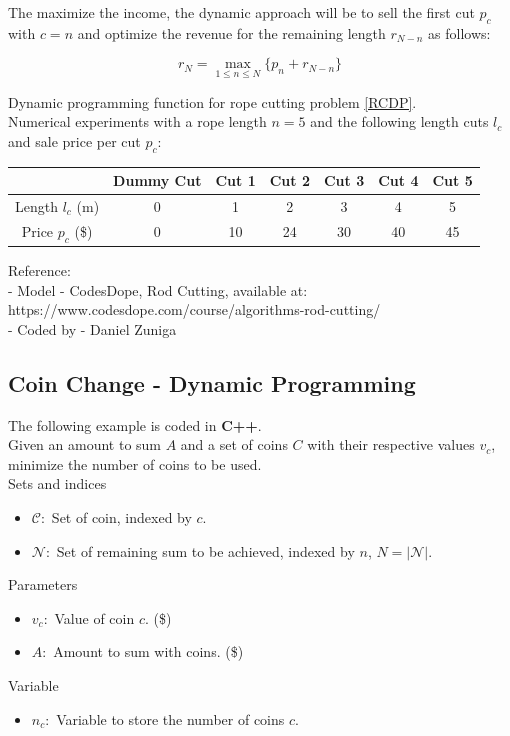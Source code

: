 \documentclass[10pt,bezier]{article}
\begin{document}
The maximize the income, the dynamic approach will be to sell the first cut $p_c$ with $c = n$ and optimize the revenue for the remaining length $r_{N-n}$ as follows:

\begin{equation}\label{RCDP}
    r_N = \max_{1 \leq n \leq N} \{p_n + r_{N-n}\}
\end{equation}

Dynamic programming function for rope cutting problem \eqref{RCDP}.\\

Numerical experiments with a rope length $n=5$ and the following length cuts $l_c$ and sale price per cut $p_c$:
\begin{table}[!htbp]
    \centering
    \begin{tabular}{c | c c c c c c}
            & Dummy Cut & Cut 1 & Cut 2 & Cut 3 & Cut 4 & Cut 5 \\ \hline
        Length $l_c$ (m) & 0 & 1 & 2 & 3 & 4 & 5 \\
        Price $p_c$ (\$) & 0 & 10 & 24 & 30 & 40 & 45
    \end{tabular}
\end{table}

\noindent Reference:\\
- Model - CodesDope, Rod Cutting, available at: {\color{blue}https://www.codesdope.com/course/algorithms-rod-cutting/}\\
- Coded by - Daniel Zuniga

\newpage
\subsection{Coin Change - Dynamic Programming}\label{Section7.4}
The following example is coded in {\color{blue}\textbf{C++}}.\\

Given an amount to sum $A$ and a set of coins  $C$ with their respective values $v_c$, minimize the number of coins to be used.\\

\noindent Sets and indices
\begin{itemize}
  \item $\mathcal{C}$:~Set of coin, indexed by $c$.
  \item $\mathcal{N}$:~Set of remaining sum to be achieved, indexed by $n$, $N = |\mathcal{N}|$.
\end{itemize}
Parameters
\begin{itemize}
    \item $v_c$:~Value of coin $c$. (\$)
    \item $A$:~Amount to sum with coins. (\$)
\end{itemize}
Variable
\begin{itemize}
    \item $n_c$:~Variable to store the number of coins $c$.\\
\end{itemize}
\end{document}
